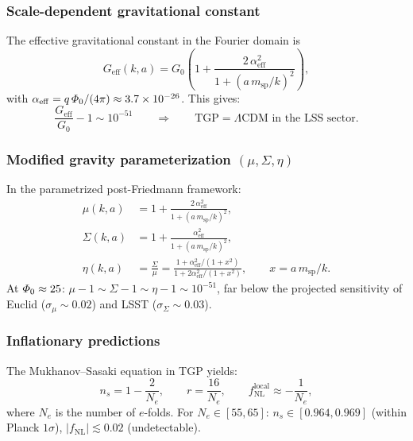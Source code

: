 \subsubsection{Scale-dependent gravitational constant}

The effective gravitational constant in the Fourier domain is
\begin{equation}\label{eq:Geff}
  G_{\mathrm{eff}}(k,a)
  = G_{0}\left(1 + \frac{2\,\alpha_{\mathrm{eff}}^{2}}
    {1 + (a\,m_{\mathrm{sp}}/k)^{2}}\right),
\end{equation}
with $\alpha_{\mathrm{eff}}=q\,\varPhi_0/(4\pi)\approx 3.7\times 10^{-26}$.
This gives:
\begin{equation}
  \frac{G_{\mathrm{eff}}}{G_{0}} - 1 \sim 10^{-51}
  \qquad\Longrightarrow\qquad
  \text{TGP} = \Lambda\text{CDM in the LSS sector.}
\end{equation}

\subsubsection{Modified gravity parameterization $(\mu,\Sigma,\eta)$}

In the parametrized post-Friedmann framework:
\begin{align}
  \mu(k,a) &= 1 + \frac{2\,\alpha_{\mathrm{eff}}^{2}}
               {1 + (a\,m_{\mathrm{sp}}/k)^{2}}, \\
  \Sigma(k,a) &= 1 + \frac{\alpha_{\mathrm{eff}}^{2}}
               {1 + (a\,m_{\mathrm{sp}}/k)^{2}}, \\
  \eta(k,a) &= \frac{\Sigma}{\mu}
  = \frac{1 + \alpha_{\mathrm{eff}}^{2}/(1+x^{2})}
         {1 + 2\alpha_{\mathrm{eff}}^{2}/(1+x^{2})},
  \qquad x = a\,m_{\mathrm{sp}}/k.
\end{align}
At $\varPhi_0\approx 25$:
$\mu-1 \sim \Sigma-1 \sim \eta-1 \sim 10^{-51}$,
far below the projected sensitivity of Euclid
($\sigma_{\mu}\sim 0.02$) and LSST ($\sigma_{\Sigma}\sim 0.03$).

\subsubsection{Inflationary predictions}

The Mukhanov--Sasaki equation in TGP yields:
\begin{equation}\label{eq:ns-r}
  n_{s} = 1 - \frac{2}{N_{e}},
  \qquad
  r = \frac{16}{N_{e}},
  \qquad
  f_{\mathrm{NL}}^{\mathrm{local}} \approx -\frac{1}{N_{e}},
\end{equation}
where $N_{e}$ is the number of $e$-folds.
For $N_{e}\in[55,65]$:
$n_{s}\in[0.964, 0.969]$ (within Planck $1\sigma$),
$|f_{\mathrm{NL}}|\lesssim 0.02$ (undetectable).

